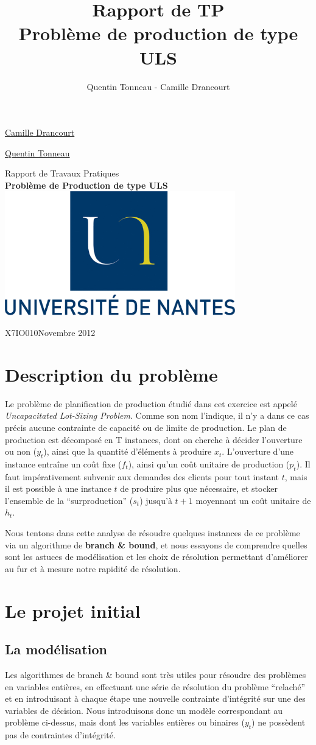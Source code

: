 \documentclass[a4paper,11pt,twoside]{report}
\title {Rapport de TP \\ Problème de production de type ULS}
\author {Quentin Tonneau - Camille Drancourt}
\date{}
\begin{document}
\thispagestyle{empty}
\Large{\uline{
\noindent Camille Drancourt}


\uline{Quentin Tonneau}}
\vfill
\begin{center}
\Huge{
 Rapport de Travaux Pratiques\\
 \textbf{Problème de Production de type ULS}}
 \vfill
 \includegraphics[width=0.75\textwidth]{logo_univ_nantes.png}
 \vfill
\end{center}
X7IO010\hfill Novembre 2012
\newpage ~
\tableofcontents
\newpage
\pagestyle{plain}
\chapter{Description du problème}
Le problème de planification de production étudié dans cet exercice est appelé \textit{Uncapacitated Lot-Sizing Problem}. Comme son nom l'indique, il n'y a dans ce cas précis aucune contrainte de capacité ou de limite de production.
Le plan de production est décomposé en T instances, dont on cherche à décider l'ouverture ou non ($y_t$), ainsi que la quantité d'éléments à produire $x_t$. L'ouverture d'une instance entraîne un coût fixe ($f_t$), ainsi qu'un coût unitaire de production ($p_t$).
Il faut impérativement subvenir aux demandes des clients pour tout instant $t$, mais il est possible à une instance $t$ de produire plus que nécessaire, et stocker l'ensemble de la ``surproduction'' ($s_t$) jusqu'à $t+1$ moyennant un coût unitaire de $h_t$.


Nous tentons dans cette analyse de résoudre quelques instances de ce problème via un algorithme de \textbf{branch \& bound}, et nous essayons de comprendre quelles sont les astuces de modélisation et les choix de résolution permettant d'améliorer au fur et à mesure notre rapidité de résolution.

\chapter{Le projet initial}
\section{La modélisation}
Les algorithmes de branch \& bound sont très utiles pour résoudre des problèmes en variables entières, en effectuant une série de résolution du problème ``relaché'' et en introduisant à chaque étape une nouvelle contrainte d'intégrité sur une des variables de décision.
Nous introduisons donc un modèle correspondant au problème ci-dessus, mais dont les variables entières ou binaires ($y_t$) ne possèdent pas de contraintes d’intégrité.
\end{document}
